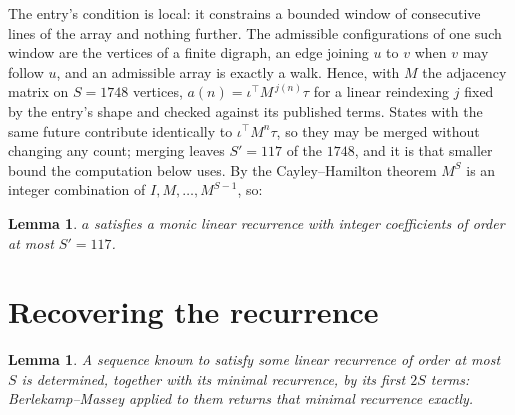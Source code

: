 \documentclass[11pt,a4paper]{article}
\theoremstyle{plain}
\newtheorem{lemma}[theorem]{Lemma}
\theoremstyle{definition}
\begin{document}
The entry's condition is local: it constrains a bounded window of consecutive lines of the
array and nothing further. The admissible configurations of one such window are the vertices
of a finite digraph, an edge joining $u$ to $v$ when $v$ may follow $u$, and an admissible
array is exactly a walk. Hence, with $M$ the adjacency matrix on $S=1748$ vertices,
$a(n)=\iota^{\!\top}M^{\,j(n)}\tau$ for a linear reindexing $j$ fixed by the entry's shape
and checked against its published terms. States with the same future contribute identically to $\iota^{\!\top}M^n\tau$, so they may be merged without changing any count; merging leaves $S'=117$ of the $1748$, and it is that smaller bound the computation below uses. By the Cayley--Hamilton theorem $M^{S}$ is an
integer combination of $I,M,\dots,M^{S-1}$, so:

\begin{lemma}\label{lem:cf}
$a$ satisfies a monic linear recurrence with integer coefficients of order at most
$S'=117$.
\end{lemma}

\section{Recovering the recurrence}

\begin{lemma}\label{lem:bm}
A sequence known to satisfy some linear recurrence of order at most $S$ is determined, together
with its minimal recurrence, by its first $2S$ terms: Berlekamp--Massey applied to them returns
that minimal recurrence exactly.
\end{lemma}
\end{document}
